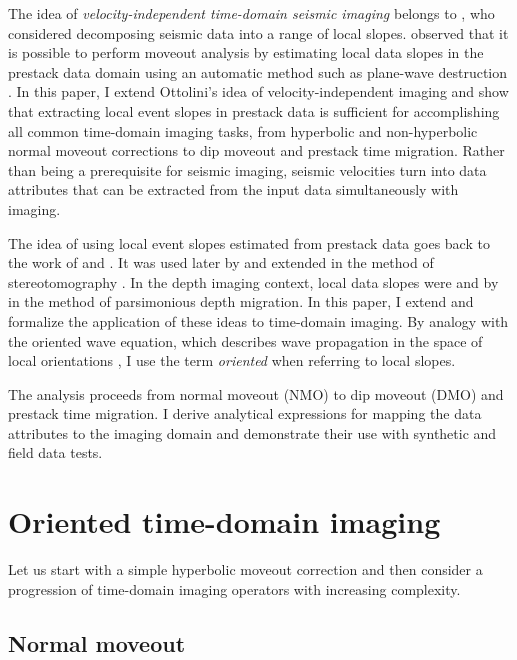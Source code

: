 The idea of \emph{velocity-independent time-domain seismic imaging} belongs to
\cite{Ottolini.sep.37.59}, who considered decomposing seismic data into a
range of local slopes.  \cite{wolf} 
 observed
that it is possible to perform moveout analysis by estimating local data
slopes in the prestack data domain using an automatic method such as
plane-wave destruction \cite[]{GEO67-06-19461960}.  In this paper, I extend
Ottolini's idea of velocity-independent imaging and show that extracting local
event slopes in prestack data is sufficient for accomplishing all common
time-domain imaging tasks, from hyperbolic and non-hyperbolic normal moveout
corrections to dip moveout and prestack time migration. Rather than being a
prerequisite for seismic imaging, seismic velocities turn into data attributes
that can be extracted from the input data simultaneously with imaging.

The idea of using local event slopes estimated from prestack 
data goes back to the work of \cite{GEO01-01-00970106} and
\cite{riabinkin}. It was used later by \cite{Sword.sepphd.55} and
extended in the method of stereotomography
\cite[]{billette,GEO68-03-10081021,lambare,SEG-2004-23672370}.  In the
depth imaging context, local data slopes were  and by
\cite{GEO68-03-10431051} in the method of parsimonious depth
migration. In this paper, I extend and formalize the application of
these ideas to time-domain imaging. By analogy with the oriented wave
equation, which describes wave propagation in the space of local
orientations \cite[]{SEG-2003-08930898}, I use the term
\emph{oriented} when referring to local slopes.

The analysis proceeds from normal moveout (NMO) to dip moveout (DMO)
and prestack time migration. I derive analytical expressions for
mapping the data attributes to the imaging domain and demonstrate
their use with synthetic and field data tests.

\section{Oriented time-domain imaging}

Let us start with a simple hyperbolic moveout correction and then
consider a progression of time-domain imaging operators with
increasing complexity.

\subsection{Normal moveout}

